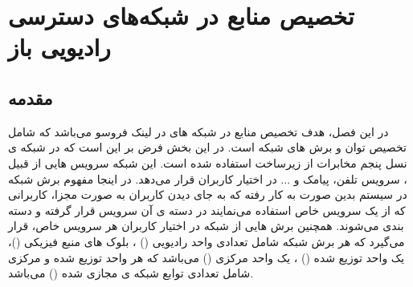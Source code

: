 \chapter{تخصیص منابع در شبکه‌های دسترسی رادیویی باز}
\section{مقدمه}
در این فصل، هدف تخصیص منابع در شبکه های  در لینک فروسو می‌باشد که شامل تخصیص توان و برش های شبکه است.
در این بخش فرض بر این است که در شبکه ی نسل پنجم مخابرات از زیرساخت  استفاده شده است. این شبکه سرویس هایی از قبیل ، سرویس تلفن، پیامک و ... در اختیار کاربران قرار می‌دهد. در اینجا  مفهوم برش شبکه در سیستم بدین صورت به کار رفته که به جای دیدن کاربران به صورت مجزا، کاربرانی که از یک سرویس خاص استفاده می‌نمایند در دسته ی آن سرویس قرار گرفته و دسته بندی می‌شوند. همچنین برش هایی از شبکه در اختیار کاربران هر سرویس خاص، قرار می‌گیرد که هر برش شبکه شامل تعدادی واحد رادیویی
() 
،
بلوک های منبع فیزیکی
 ()، 
 یک واحد توزیع شده
() 
 ، 
 یک واحد مرکزی
()  
  می‌باشد که هر واحد توزیع شده و مرکزی شامل تعدادی توابع شبکه ی مجازی شده
() 
می‌باشد. 

